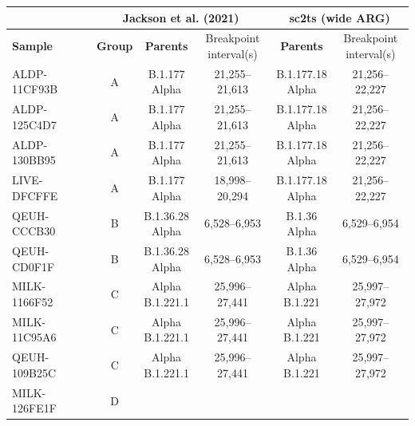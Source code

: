 \documentclass{article}
\begin{document}
\begin{table} \centering \begin{tabular}{l|c|c|c|c|c} \hline
\multicolumn{1}{c}{} & \multicolumn{3}{c}{\textbf{Jackson et al. (2021)}} &
\multicolumn{2}{c}{\textbf{sc2ts (wide ARG)}} \\ \hline \textbf{Sample} &
\textbf{Group} & \textbf{Parents} & \thead{Breakpoint \\ interval(s)} &
\textbf{Parents} & \thead{Breakpoint \\ interval(s)} \\ \hline ALDP-11CF93B & A
& \thead{B.1.177 \\ Alpha} & 21,255–21,613 & \thead{B.1.177.18 \\ Alpha} &
21,256–22,227 \\ ALDP-125C4D7 & A & \thead{B.1.177 \\ Alpha} & 21,255–21,613 &
\thead{B.1.177.18 \\ Alpha} & 21,256–22,227 \\ ALDP-130BB95 & A &
\thead{B.1.177 \\ Alpha} & 21,255–21,613 & \thead{B.1.177.18 \\ Alpha} &
21,256–22,227 \\ LIVE-DFCFFE & A & \thead{B.1.177 \\ Alpha} & 18,998–20,294 &
\thead{B.1.177.18 \\ Alpha} & 21,256–22,227 \\ QEUH-CCCB30 & B &
\thead{B.1.36.28 \\ Alpha} & 6,528–6,953 & \thead{B.1.36 \\ Alpha} &
6,529–6,954 \\ QEUH-CD0F1F & B & \thead{B.1.36.28 \\ Alpha} & 6,528–6,953 &
\thead{B.1.36 \\ Alpha} & 6,529–6,954 \\ MILK-1166F52 & C & \thead{Alpha \\
B.1.221.1} & 25,996–27,441 & \thead{Alpha \\ B.1.221} & 25,997–27,972 \\
MILK-11C95A6 & C & \thead{Alpha \\ B.1.221.1} & 25,996–27,441 & \thead{Alpha \\
B.1.221} & 25,997–27,972 \\ QEUH-109B25C & C & \thead{Alpha \\ B.1.221.1} &
25,996–27,441 & \thead{Alpha \\ B.1.221} & 25,997–27,972 \\ MILK-126FE1F & D &

\end{tabular}
\end{table}
\end{document}
